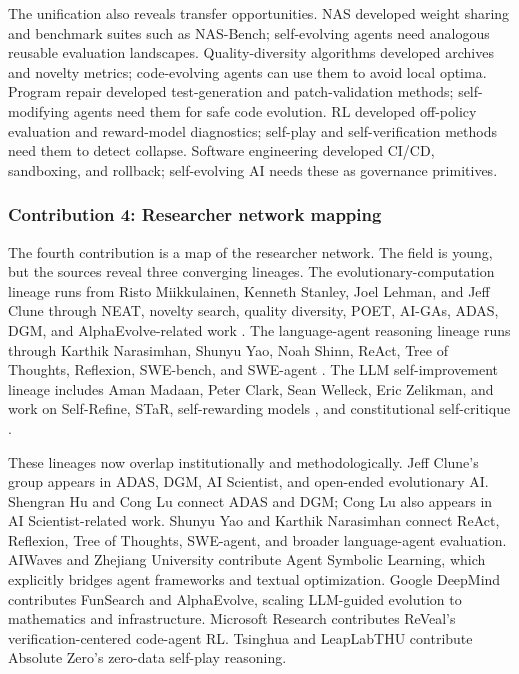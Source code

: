 The unification also reveals transfer opportunities. NAS developed weight sharing and benchmark suites such as NAS-Bench; self-evolving agents need analogous reusable evaluation landscapes. Quality-diversity algorithms developed archives and novelty metrics; code-evolving agents can use them to avoid local optima. Program repair developed test-generation and patch-validation methods; self-modifying agents need them for safe code evolution. RL developed off-policy evaluation and reward-model diagnostics; self-play and self-verification methods need them to detect collapse. Software engineering developed CI/CD, sandboxing, and rollback; self-evolving AI needs these as governance primitives.

\subsubsection{Contribution 4: Researcher network mapping}

The fourth contribution is a map of the researcher network. The field is young, but the sources reveal three converging lineages. The evolutionary-computation lineage runs from Risto Miikkulainen, Kenneth Stanley, Joel Lehman, and Jeff Clune through NEAT, novelty search, quality diversity, POET, AI-GAs, ADAS, DGM, and AlphaEvolve-related work \cite{stanley2002evolving,lehman2011abandoning,clune2019ai,adas2025,darwingodelmachine2025}. The language-agent reasoning lineage runs through Karthik Narasimhan, Shunyu Yao, Noah Shinn, ReAct, Tree of Thoughts, Reflexion, SWE-bench, and SWE-agent \cite{yao2023react,yao2023tree,reflexion2023}. The LLM self-improvement lineage includes Aman Madaan, Peter Clark, Sean Welleck, Eric Zelikman, and work on Self-Refine, STaR, self-rewarding models \cite{selfrewarding2024}, and constitutional self-critique \cite{selfrefine2023,star2022,constitutionalai2022}.

These lineages now overlap institutionally and methodologically. Jeff Clune's group appears in ADAS, DGM, AI Scientist, and open-ended evolutionary AI. Shengran Hu and Cong Lu connect ADAS and DGM; Cong Lu also appears in AI Scientist-related work. Shunyu Yao and Karthik Narasimhan connect ReAct, Reflexion, Tree of Thoughts, SWE-agent, and broader language-agent evaluation. AIWaves and Zhejiang University contribute Agent Symbolic Learning, which explicitly bridges agent frameworks and textual optimization. Google DeepMind contributes FunSearch and AlphaEvolve, scaling LLM-guided evolution to mathematics and infrastructure. Microsoft Research contributes ReVeal's verification-centered code-agent RL. Tsinghua and LeapLabTHU contribute Absolute Zero's zero-data self-play reasoning.

